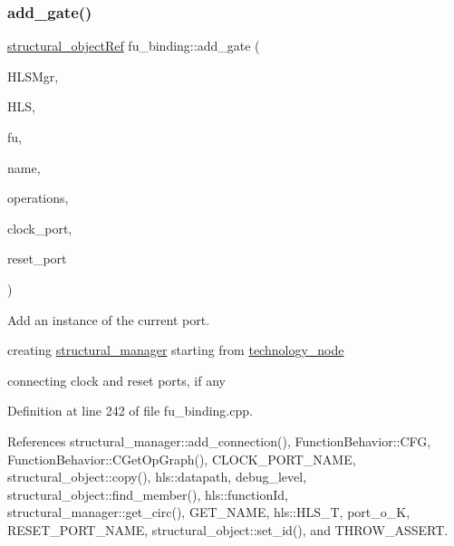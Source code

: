 \subsubsection{\texorpdfstring{add\+\_\+gate()}{add\_gate()}}
{\footnotesize\ttfamily \hyperlink{structural__objects_8hpp_a8ea5f8cc50ab8f4c31e2751074ff60b2}{structural\+\_\+object\+Ref} fu\+\_\+binding\+::add\+\_\+gate (\begin{DoxyParamCaption}\item[{const \hyperlink{hls__manager_8hpp_acd3842b8589fe52c08fc0b2fcc813bfe}{H\+L\+S\+\_\+manager\+Ref}}]{H\+L\+S\+Mgr,  }\item[{const \hyperlink{hls_8hpp_a75d0c73923d0ddfa28c4843a802c73a7}{hls\+Ref}}]{H\+LS,  }\item[{const \hyperlink{technology__node_8hpp_a33dd193b7bd6b987bf0d8a770a819fa7}{technology\+\_\+node\+Ref}}]{fu,  }\item[{const std\+::string \&}]{name,  }\item[{const \hyperlink{classOpVertexSet}{Op\+Vertex\+Set} \&}]{operations,  }\item[{\hyperlink{structural__objects_8hpp_a8ea5f8cc50ab8f4c31e2751074ff60b2}{structural\+\_\+object\+Ref}}]{clock\+\_\+port,  }\item[{\hyperlink{structural__objects_8hpp_a8ea5f8cc50ab8f4c31e2751074ff60b2}{structural\+\_\+object\+Ref}}]{reset\+\_\+port }\end{DoxyParamCaption})\hspace{0.3cm}{\ttfamily [protected]}}



Add an instance of the current port. 

creating \hyperlink{classstructural__manager}{structural\+\_\+manager} starting from \hyperlink{structtechnology__node}{technology\+\_\+node}

connecting clock and reset ports, if any 

Definition at line 242 of file fu\+\_\+binding.\+cpp.



References structural\+\_\+manager\+::add\+\_\+connection(), Function\+Behavior\+::\+C\+FG, Function\+Behavior\+::\+C\+Get\+Op\+Graph(), C\+L\+O\+C\+K\+\_\+\+P\+O\+R\+T\+\_\+\+N\+A\+ME, structural\+\_\+object\+::copy(), hls\+::datapath, debug\+\_\+level, structural\+\_\+object\+::find\+\_\+member(), hls\+::function\+Id, structural\+\_\+manager\+::get\+\_\+circ(), G\+E\+T\+\_\+\+N\+A\+ME, hls\+::\+H\+L\+S\+\_\+T, port\+\_\+o\+\_\+K, R\+E\+S\+E\+T\+\_\+\+P\+O\+R\+T\+\_\+\+N\+A\+ME, structural\+\_\+object\+::set\+\_\+id(), and T\+H\+R\+O\+W\+\_\+\+A\+S\+S\+E\+RT.



